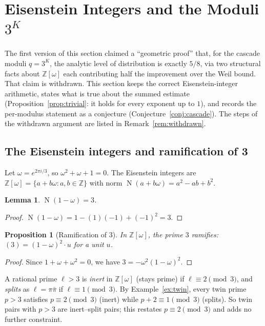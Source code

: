 \documentclass[12pt]{amsart}
\theoremstyle{plain}
\newtheorem{proposition}[theorem]{Proposition}
\newtheorem{lemma}[theorem]{Lemma}
\theoremstyle{definition}
\theoremstyle{remark}
\newcommand{\Z}{\mathbb{Z}}
\newcommand{\Zomega}{\Z[\omega]}
\DeclareMathOperator{\N}{N}
\begin{document}
\section{Eisenstein Integers and the Moduli $3^K$}
\label{sec:geometric}

The first version of this section claimed a ``geometric proof'' that, for the
cascade moduli $q = 3^K$, the analytic level of distribution is exactly $5/8$,
via two structural facts about $\Zomega$ each contributing half the improvement
over the Weil bound. That claim is withdrawn. This section keeps the correct
Eisenstein-integer arithmetic, states what is true about the summed estimate
(Proposition~\ref{prop:trivial}: it holds for every exponent up to $1$), and
records the per-modulus statement as a conjecture
(Conjecture~\ref{conj:cascade}). The steps of the withdrawn argument are listed
in Remark~\ref{rem:withdrawn}.

\subsection{The Eisenstein integers and ramification of 3}

Let $\omega = e^{2\pi i/3}$, so $\omega^2 + \omega + 1 = 0$. The Eisenstein
integers are $\Zomega = \{a + b\omega : a, b \in \Z\}$ with norm
$\N(a + b\omega) = a^2 - ab + b^2$.

\begin{lemma}
\label{lem:norm}
$\N(1 - \omega) = 3$.
\end{lemma}

\begin{proof}
$\N(1-\omega) = 1 - (1)(-1) + (-1)^2 = 3$.
\end{proof}

\begin{proposition}[Ramification of $3$]
\label{prop:ramification}
In $\Zomega$, the prime $3$ ramifies: $(3) = (1-\omega)^2 \cdot u$ for a unit $u$.
\end{proposition}

\begin{proof}
Since $1 + \omega + \omega^2 = 0$, we have $3 = -\omega^2(1-\omega)^2$.
\end{proof}

A rational prime $\ell > 3$ is \emph{inert} in $\Zomega$ (stays prime) if
$\ell \equiv 2 \pmod{3}$, and \emph{splits} as $\ell = \pi\bar{\pi}$ if $\ell
\equiv 1 \pmod{3}$. By Example~\ref{ex:twin}, every twin prime $p > 3$ satisfies
$p \equiv 2 \pmod{3}$ (inert) while $p+2 \equiv 1 \pmod{3}$ (splits). So twin
pairs with $p > 3$ are inert--split pairs; this restates $p \equiv 2 \pmod{3}$
and adds no further constraint.
\end{document}
